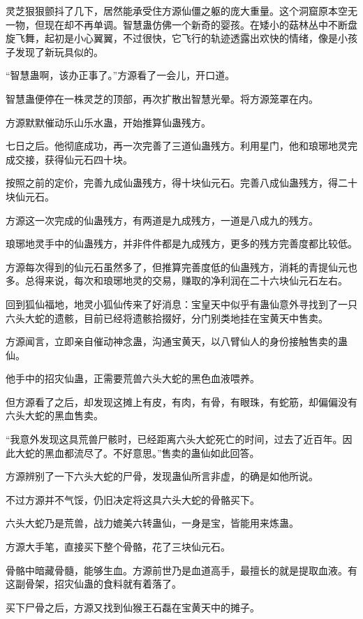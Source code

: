 \begin{this_body}
灵芝狠狠颤抖了几下，居然能承受住方源仙僵之躯的庞大重量。这个洞窟原本空无一物，但现在却不再单调。智慧蛊仿佛一个新奇的婴孩。在矮小的菇林丛中不断盘旋飞舞，起初是小心翼翼，不过很快，它飞行的轨迹透露出欢快的情绪，像是小孩子发现了新玩具似的。

“智慧蛊啊，该办正事了。”方源看了一会儿，开口道。

智慧蛊便停在一株灵芝的顶部，再次扩散出智慧光晕。将方源笼罩在内。

方源默默催动乐山乐水蛊，开始推算仙蛊残方。

七日之后。他彻底成功，再一次完善了三道仙蛊残方。利用星门，他和琅琊地灵完成交接，获得仙元石四十块。

按照之前的定价，完善九成仙蛊残方，得十块仙元石。完善八成仙蛊残方，得二十块仙元石。

方源这一次完成的仙蛊残方，有两道是九成残方，一道是八成九的残方。

琅琊地灵手中的仙蛊残方，并非件件都是九成残方，更多的残方完善度都比较低。

方源每次得到的仙元石虽然多了，但推算完善度低的仙蛊残方，消耗的青提仙元也多。总得来说，每次和琅琊地灵的交易，赚取的净利润在二十六块仙元石左右。

回到狐仙福地，地灵小狐仙传来了好消息：宝皇天中似乎有蛊仙意外寻找到了一只六头大蛇的遗骸，目前已经将遗骸拾掇好，分门别类地挂在宝黄天中售卖。

方源闻言，立即亲自催动神念蛊，沟通宝黄天，以八臂仙人的身份接触售卖的蛊仙。

他手中的招灾仙蛊，正需要荒兽六头大蛇的黑色血液喂养。

但方源看了之后，却发现这摊上有皮，有肉，有骨，有眼珠，有蛇筋，却偏偏没有六头大蛇的黑血售卖。

“我意外发现这具荒兽尸骸时，已经距离六头大蛇死亡的时间，过去了近百年。因此大蛇的黑血都流尽了。不好意思。”售卖的蛊仙如此回答。

方源辨别了一下六头大蛇的尸骨，发现蛊仙所言非虚，的确是如他所说。

不过方源并不气馁，仍旧决定将这具六头大蛇的骨骼买下。

六头大蛇乃是荒兽，战力媲美六转蛊仙，一身是宝，皆能用来炼蛊。

方源大手笔，直接买下整个骨骼，花了三块仙元石。

骨骼中暗藏骨髓，能够生血。方源前世乃是血道高手，最擅长的就是提取血液。有这副骨架，招灾仙蛊的食料就有着落了。

买下尸骨之后，方源又找到仙猴王石磊在宝黄天中的摊子。


\end{this_body}
